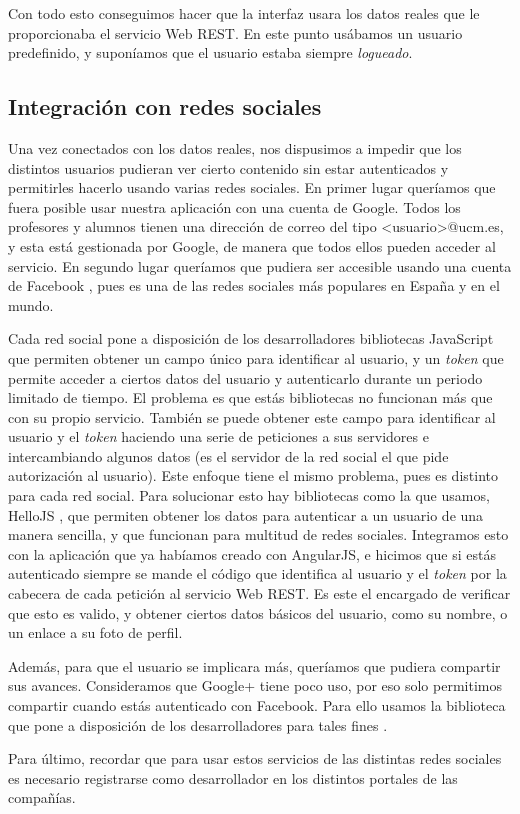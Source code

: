 Con todo esto conseguimos hacer que la interfaz usara los datos reales que le proporcionaba el servicio Web REST. En este punto usábamos un usuario predefinido, y suponíamos que el usuario estaba siempre \emph{logueado}.

\subsection{Integración con redes sociales\label{subsec:interfaz}}
Una vez conectados con los datos reales, nos dispusimos a impedir que los distintos usuarios pudieran ver cierto contenido sin estar autenticados y permitirles hacerlo usando varias redes sociales. En primer lugar queríamos que fuera posible usar nuestra aplicación con una cuenta de Google. Todos los profesores y alumnos tienen una dirección de correo del tipo \textless usuario\textgreater @ucm.es, y esta está gestionada por Google, de manera que todos ellos  pueden acceder al servicio. En segundo lugar queríamos que pudiera ser accesible usando una cuenta de Facebook \cite{facebook}, pues es una de las redes sociales más populares en España y en el mundo. 

Cada red social pone a disposición de los desarrolladores bibliotecas JavaScript que permiten obtener un campo único para identificar al usuario, y un \emph{token} que permite acceder a ciertos datos del usuario y autenticarlo durante un periodo limitado de tiempo. El problema es que estás bibliotecas no funcionan más que con su propio servicio. También se puede obtener este campo para identificar al usuario y el \emph{token} haciendo una serie de peticiones a sus servidores e intercambiando algunos datos (es el servidor de la red social el que pide autorización al usuario). Este enfoque tiene el mismo problema, pues es distinto para cada red social. Para solucionar esto hay bibliotecas como la que usamos, HelloJS \cite{hello}, que permiten obtener los datos para autenticar a un usuario de una manera sencilla, y que funcionan para multitud de redes sociales. Integramos esto con la aplicación que ya habíamos creado con AngularJS, e hicimos que si estás autenticado siempre se mande el código que identifica al usuario y el \emph{token} por la cabecera de cada petición al servicio Web REST. Es este el encargado de verificar que esto es valido, y obtener ciertos datos básicos del usuario, como su nombre, o un enlace a su foto de perfil.

Además, para que el usuario se implicara más, queríamos que pudiera compartir sus avances. Consideramos que Google+ tiene poco uso, por eso solo permitimos compartir cuando estás autenticado con Facebook. Para ello usamos la biblioteca que pone a disposición de los desarrolladores para tales fines \cite{libreriaFacebook}.

Para último, recordar que para usar estos servicios de las distintas redes sociales es necesario registrarse como desarrollador en los distintos portales de las compañías.